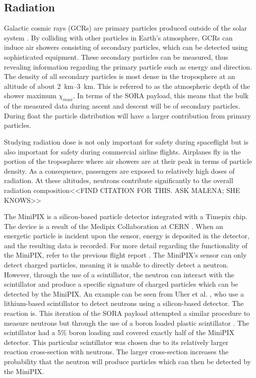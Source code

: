 \subsection{Radiation}
\label{sec: Radiation Background}

Galactic cosmic rays (GCRs) are primary particles produced outside of the solar system \cite{GCRs}.
By colliding with other particles in Earth's atmosphere, GCRs can induce air showers consisting of secondary particles, which can be detected using sophisticated equipment.
These secondary particles can be measured, thus revealing information regarding the primary particle such as energy and direction. 
The density of all secondary particles \cite{Frank} is most dense in the troposphere at an altitude of about \SIrange{2}{3}{\kilo\meter}.
This is referred to as the atmospheric depth of the shower maximum $\chi _{max}$.
In terms of the SORA payload, this means that the bulk of the measured data during ascent and descent will 
be of secondary particles.
During float the particle distribution will have a larger contribution from primary particles.

Studying radiation dose is not only important for safety during spaceflight but is also important for safety during commercial airline flights.
Airplanes fly in the portion of the troposphere where air showers are at their peak in terms of particle density. As a consequence, passengers are exposed to relatively high doses of radiation.
At these altitudes, neutrons contribute significantly to the overall radiation composition<<FIND CITATION FOR THIS. ASK MALENA; SHE KNOWS>>

The MiniPIX \cite{silicon_sensor} is a silicon-based particle detector integrated with a Timepix \cite{timepix} chip. The device is a result of the Medipix Collaboration at CERN \cite{medipix}. 
When an energetic particle is incident upon the sensor, energy is deposited in the detector, and the resulting data is recorded.
For more detail regarding the functionality of the MiniPIX, refer to the previous flight report \cite{SORA}.
The MiniPIX's sensor can only detect charged particles, meaning it is unable to directly detect a neutron. However, through the use of a scintillator, the neutron can interact with the scintillator and produce a specific signature of charged particles which can be detected by the MiniPIX.
An example can be seen from Uher et al. \cite{Uher}, who use a lithium-based scintillator to detect neutrons using a silicon-based detector. The reaction is.
This iteration of the SORA payload attempted a similar procedure to measure neutrons but through the use of a boron loaded plastic scintillator \cite{BoronScintillator}.
The scintillator had a 5\% boron loading and covered exactly half of the MiniPIX detector.
This particular scintillator was chosen due to its relatively larger reaction cross-section with neutrons.
The larger cross-section increases the probability that the neutron will produce particles which can then be detected by the MiniPIX.
